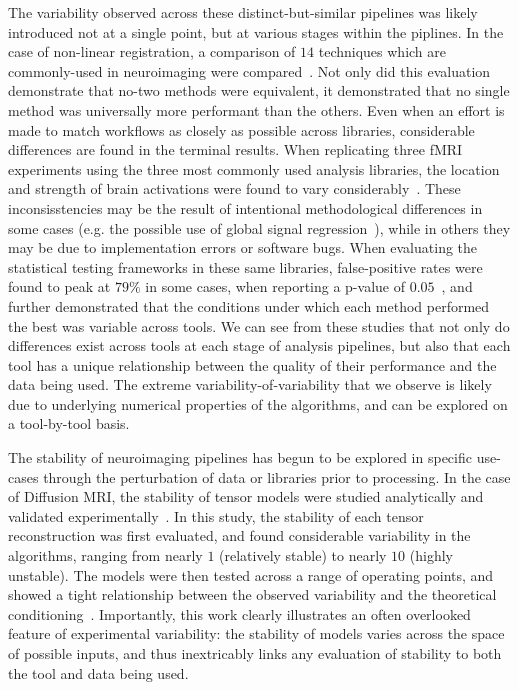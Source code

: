 The variability observed across these distinct-but-similar pipelines was likely introduced not at a single point, but
at various stages within the piplines. In the case of non-linear registration, a comparison of $14$ techniques which
are commonly-used in neuroimaging were compared~\cite{klein2009evaluation}. Not only did this evaluation demonstrate
that no-two methods were equivalent, it demonstrated that no single method was universally more performant than the
others. Even when an effort is made to match workflows as closely as possible across libraries, considerable
differences are found in the terminal results. When replicating three fMRI experiments using the three most commonly
used analysis libraries, the location and strength of brain activations were found to vary
considerably~\cite{bowring2019exploring}. These inconsisstencies may be the result of intentional methodological
differences in some cases (e.g. the possible use of global signal regression~\cite{murphy2017towards}), while in others
they may be due to implementation errors or software bugs. When evaluating the statistical testing frameworks in these
same libraries, false-positive rates were found to peak at $79\%$ in some cases, when reporting a p-value of
$0.05$~\cite{eklund2016cluster}, and further demonstrated that the conditions under which each method performed the
best was variable across tools. We can see from these studies that not only do differences exist across tools at each
stage of analysis pipelines, but also that each tool has a unique relationship between the quality of their performance
and the data being used. The extreme variability-of-variability that we observe is likely due to underlying numerical
properties of the algorithms, and can be explored on a tool-by-tool basis.

The stability of neuroimaging pipelines has begun to be explored in specific use-cases through the perturbation of data
or libraries prior to processing. In the case of Diffusion MRI, the stability of tensor models were studied
analytically and validated experimentally~\cite{skare2000condition}. In this study, the stability of each tensor
reconstruction was first evaluated, and found considerable variability in the algorithms, ranging from nearly $1$
(relatively stable) to nearly $10$ (highly unstable). The models were then tested across a range of operating points,
and showed a tight relationship between the observed variability and the theoretical
conditioning~\cite{skare2000condition}. Importantly, this work clearly illustrates an often overlooked feature of
experimental variability: the stability of models varies across the space of possible inputs, and thus inextricably
links any evaluation of stability to both the tool and data being used.

